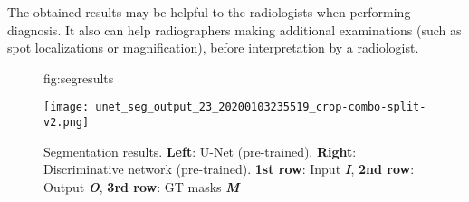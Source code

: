 \documentclass{midl} %
\begin{document}
The obtained results may be helpful to the radiologists when performing diagnosis. It also can help radiographers making additional examinations (such as spot localizations or magnification), before interpretation by a radiologist. 


\begin{figure}[htbp]
\floatconts
  {fig:segresults}
  {\caption{Segmentation results. \textbf{Left}: U-Net (pre-trained), \textbf{Right}:  Discriminative network (pre-trained). \textbf{1st row}: Input \textbf{\textit{I}}, \textbf{2nd row}: Output \textbf{\textit{O}}, \textbf{3rd row}: GT masks \textbf{\textit{M}}}}
  {\texttt{[image: unet\_seg\_output\_23\_20200103235519\_crop-combo-split-v2.png]}\vspace{-0.5mm}}

\end{figure}







\end{document}
